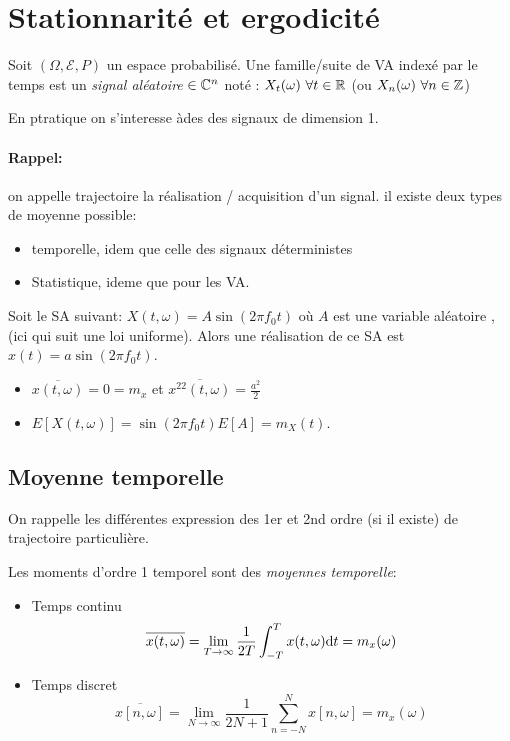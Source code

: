 \documentclass[main.tex]{subfiles}
\begin{document}
\section{Stationnarité et ergodicité}
\begin{defin}
  Soit $(\Omega,\mathcal{E},P)$ un espace probabilisé.
  Une famille/suite de VA indexé par le temps est un \emph{signal aléatoire} $\in\mathbb{C}^n$ noté : $X_t(\omega) ~ \forall t\in \mathbb{R}$ (ou $X_n(\omega) ~ \forall n \in \mathbb{Z}$)
\end{defin}

En ptratique on s'interesse àdes des signaux de dimension 1.
\paragraph{Rappel:} on appelle trajectoire la réalisation / acquisition d'un signal. il existe deux types de moyenne possible:
\begin{itemize}
\item temporelle, idem que celle des signaux déterministes
\item Statistique, ideme que pour les VA.
\end{itemize}
\begin{exemple}Soit le SA suivant:
  $X(t,\omega) =A \sin(2\pi f_0 t)$ où $A$ est une variable aléatoire , (ici qui suit une loi uniforme).
  Alors une réalisation de ce SA est $x(t)=a\sin(2 \pi f_0 t)$.
  \begin{itemize}
  \item $\overline{x(t,\omega)} = 0 = m_x$ et $\overline{x^22(t,\omega)} = \frac{a^2}{2}$
  \item $E[X(t,\omega)] =\sin(2 \pi f_0 t)E[A] = m_X(t)$.
  \end{itemize}
\end{exemple}
\subsection{Moyenne temporelle}
On rappelle les différentes expression des 1er et 2nd ordre (si il existe) de trajectoire particulière.
\begin{defin}
  Les moments d'ordre 1 temporel sont des \emph{moyennes temporelle}:
  \begin{itemize}
  \item Temps continu
    \[
      \overline{x(t,\omega)}=\lim_{T\to\infty}\frac{1}{2T}\int_{-T}^{T}x(t,\omega)\mbox{d} t = m_x(\omega)
    \]
  \item Temps discret
    \[
      \overline{x[n,\omega]} =\lim_{N\to\infty}\frac{1}{2N+1} \sum_{n=-N}^{N}x[n,\omega] =m_x(\omega)
    \]
  \end{itemize}
\end{defin}
\end{document}
